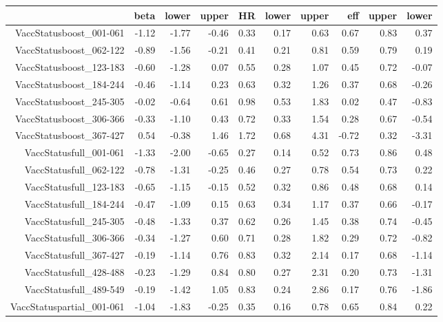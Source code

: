 \begin{table}[ht]
\centering
\begin{tabular}{rrrrrrrrrr}
  \hline
 & beta & lower & upper & HR & lower & upper & eff & upper & lower \\ 
  \hline
VaccStatusboost\_001-061 & -1.12 & -1.77 & -0.46 & 0.33 & 0.17 & 0.63 & 0.67 & 0.83 & 0.37 \\ 
  VaccStatusboost\_062-122 & -0.89 & -1.56 & -0.21 & 0.41 & 0.21 & 0.81 & 0.59 & 0.79 & 0.19 \\ 
  VaccStatusboost\_123-183 & -0.60 & -1.28 & 0.07 & 0.55 & 0.28 & 1.07 & 0.45 & 0.72 & -0.07 \\ 
  VaccStatusboost\_184-244 & -0.46 & -1.14 & 0.23 & 0.63 & 0.32 & 1.26 & 0.37 & 0.68 & -0.26 \\ 
  VaccStatusboost\_245-305 & -0.02 & -0.64 & 0.61 & 0.98 & 0.53 & 1.83 & 0.02 & 0.47 & -0.83 \\ 
  VaccStatusboost\_306-366 & -0.33 & -1.10 & 0.43 & 0.72 & 0.33 & 1.54 & 0.28 & 0.67 & -0.54 \\ 
  VaccStatusboost\_367-427 & 0.54 & -0.38 & 1.46 & 1.72 & 0.68 & 4.31 & -0.72 & 0.32 & -3.31 \\ 
  VaccStatusfull\_001-061 & -1.33 & -2.00 & -0.65 & 0.27 & 0.14 & 0.52 & 0.73 & 0.86 & 0.48 \\ 
  VaccStatusfull\_062-122 & -0.78 & -1.31 & -0.25 & 0.46 & 0.27 & 0.78 & 0.54 & 0.73 & 0.22 \\ 
  VaccStatusfull\_123-183 & -0.65 & -1.15 & -0.15 & 0.52 & 0.32 & 0.86 & 0.48 & 0.68 & 0.14 \\ 
  VaccStatusfull\_184-244 & -0.47 & -1.09 & 0.15 & 0.63 & 0.34 & 1.17 & 0.37 & 0.66 & -0.17 \\ 
  VaccStatusfull\_245-305 & -0.48 & -1.33 & 0.37 & 0.62 & 0.26 & 1.45 & 0.38 & 0.74 & -0.45 \\ 
  VaccStatusfull\_306-366 & -0.34 & -1.27 & 0.60 & 0.71 & 0.28 & 1.82 & 0.29 & 0.72 & -0.82 \\ 
  VaccStatusfull\_367-427 & -0.19 & -1.14 & 0.76 & 0.83 & 0.32 & 2.14 & 0.17 & 0.68 & -1.14 \\ 
  VaccStatusfull\_428-488 & -0.23 & -1.29 & 0.84 & 0.80 & 0.27 & 2.31 & 0.20 & 0.73 & -1.31 \\ 
  VaccStatusfull\_489-549 & -0.19 & -1.42 & 1.05 & 0.83 & 0.24 & 2.86 & 0.17 & 0.76 & -1.86 \\ 
  VaccStatuspartial\_001-061 & -1.04 & -1.83 & -0.25 & 0.35 & 0.16 & 0.78 & 0.65 & 0.84 & 0.22 \\ 

\end{tabular}
\end{table}
